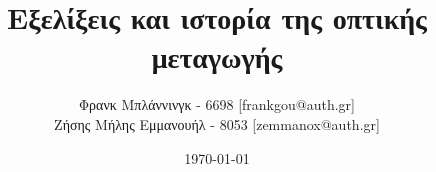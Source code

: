 \documentclass[11pt]{article}
\title{Εξελίξεις και ιστορία της οπτικής μεταγωγής}
\author{ Φρανκ Μπλάννινγκ - 6698 [frankgou@auth.gr] \\
  Ζήσης Μήλης Εμμανουήλ - 8053 [zemmanox@auth.gr]
}
\date{\today}
\begin{document}
\maketitle











{}
% 
\end{document}
